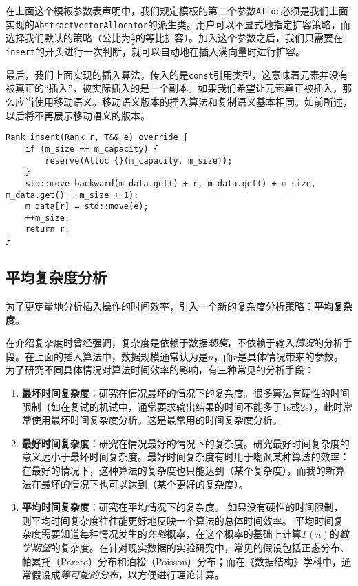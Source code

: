 在上面这个模板参数表声明中，我们规定模板的第二个参数\lstinline{Alloc}必须是我们上面实现的\lstinline{AbstractVectorAllocator}的派生类。用户可以不显式地指定扩容策略，而选择我们默认的策略（公比为$\frac{3}{2}$的等比扩容）。加入这个参数之后，我们只需要在\lstinline{insert}的开头进行一次判断，就可以自动地在插入满向量时进行扩容。

最后，我们上面实现的插入算法，传入的是\lstinline{const}引用类型，这意味着元素并没有被真正的“插入”，被实际插入的是一个副本。如果我们希望让元素真正被插入，那么应当使用移动语义。移动语义版本的插入算法和复制语义基本相同。如前所述，以后将不再展示移动语义的版本。

\begin{lstlisting}
Rank insert(Rank r, T&& e) override {
    if (m_size == m_capacity) {
        reserve(Alloc {}(m_capacity, m_size));
    }
    std::move_backward(m_data.get() + r, m_data.get() + m_size, m_data.get() + m_size + 1);
    m_data[r] = std::move(e);
    ++m_size;
    return r;
}
\end{lstlisting}

\subsection{平均复杂度分析}
为了更定量地分析插入操作的时间效率，引入一个新的复杂度分析策略：\textbf{平均复杂度}。

在介绍复杂度时曾经强调，复杂度是依赖于数据\textit{规模}，不依赖于输入\textit{情况}的分析手段。在上面的插入算法中，数据规模通常认为是$n$，而$r$是具体情况带来的参数。为了研究不同具体情况对算法时间效率的影响，有三种常见的分析手段：

\begin{enumerate}
    \item \textbf{最坏时间复杂度}：研究在情况最坏的情况下的复杂度。很多算法有硬性的时间限制（如在复试的机试中，通常要求输出结果的时间不能多于1s或2s），此时常常使用最坏时间复杂度分析。这是最常用的时间复杂度分析。
    \item \textbf{最好时间复杂度}：研究在情况最好的情况下的复杂度。研究最好时间复杂度的意义远小于最坏时间复杂度。最好时间复杂度有时用于嘲讽某种算法的效率：在最好的情况下，这种算法的复杂度也只能达到（某个复杂度），而我的新算法在最坏的情况下也可以达到（某个更好的复杂度）。
    \item \textbf{平均时间复杂度}：研究在平均情况下的复杂度。
如果没有硬性的时间限制，则平均时间复杂度往往能更好地反映一个算法的总体时间效率。
平均时间复杂度需要知道每种情况发生的\textit{先验}概率，在这个概率的基础上计算$T(n)$的\textit{数学期望}的复杂度。在针对现实数据的实验研究中，常见的假设包括正态分布、帕累托（Pareto）分布和泊松（Poisson）分布；而在《数据结构》学科中，通常假设成\textit{等可能的分布}，以方便进行理论计算。
\end{enumerate}

